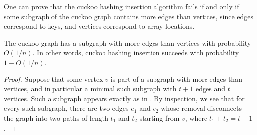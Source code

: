 \documentclass[prodmode,acmcsur]{acmsmall}
\begin{document}
One can prove that
the cuckoo hashing insertion algorithm fails if and only if  
some subgraph of
the cuckoo graph contains more edges than vertices, since edges
correspond to keys, and vertices correspond to array locations.
\begin{lem}
  The cuckoo graph has a subgraph with more edges than vertices with
  probability $O(1/n)$. In other words, cuckoo hashing insertion
  succeeds with probability $1 - O(1/n)$.
\end{lem}
\begin{proof}
  Suppose that some vertex $v$ is part of a subgraph with more edges
  than vertices, and in particular a minimal such subgraph with $t +
  1$ edges and $t$ vertices. Such a subgraph appears exactly as in
  . By inspection, we see that for every such 
  subgraph, there are two edges
  $e_1$ and $e_2$ whose removal disconnects the graph into two paths
  of length $t_1$ and $t_2$ starting from $v$, where $t_1 + t_2 = t -
  1$.


\end{proof}
\end{document}
